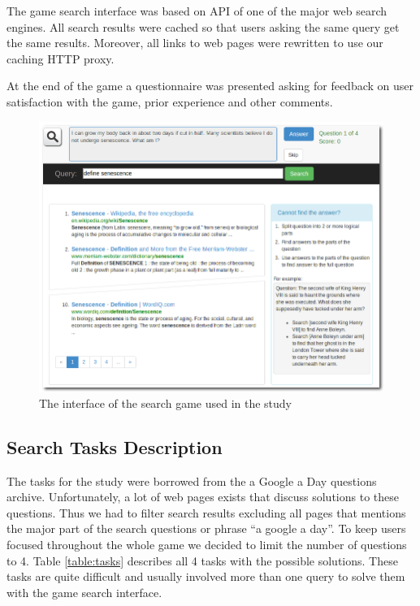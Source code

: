 \documentclass{sig-alternate}
\begin{document}
The game search interface was based on API of one of the major web search engines. All search results were cached so that users asking the same query get the same results. Moreover, all links to web pages were rewritten to use our caching HTTP proxy.

At the end of the game a questionnaire was presented asking for feedback on user satisfaction with the game, prior experience and other comments.

\begin{figure}
\centering
\includegraphics[scale=0.29]{img/ufindit}
\caption{The interface of the search game used in the study}
\label{figure:ufindit}
\end{figure}

\subsection{Search Tasks Description}

The tasks for the study were borrowed from the a Google a Day questions archive. Unfortunately, a lot of web pages exists that discuss solutions to these questions. Thus we had to filter search results excluding all pages that mentions the major part of the search questions or phrase ``a google a day''.
To keep users focused throughout the whole game we decided to limit the number of questions to 4.
Table \ref{table:tasks} describes all 4 tasks with the possible solutions. These tasks are quite difficult and usually involved more than one query to solve them with the game search interface.
\end{document}

